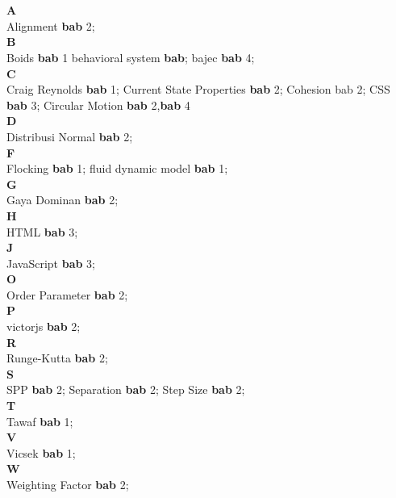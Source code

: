 \chapter*{\indexname}
\textbf{A}\\
Alignment \textbf{bab} 2;\\
\textbf{B}\\
Boids \textbf{bab} 1 behavioral system \textbf{bab}; bajec \textbf{bab} 4;\\
\textbf{C}\\
Craig Reynolds \textbf{bab} 1; Current State Properties \textbf{bab} 2; Cohesion bab 2; CSS \textbf{bab} 3; Circular Motion \textbf{bab} 2,\textbf{bab} 4\\
\textbf{D}\\
Distribusi Normal \textbf{bab} 2;\\
\textbf{F}\\
Flocking \textbf{bab} 1; fluid dynamic model \textbf{bab} 1;\\
\textbf{G}\\
Gaya Dominan \textbf{bab} 2;\\
\textbf{H}\\
HTML \textbf{bab} 3;\\
\textbf{J}\\
JavaScript \textbf{bab} 3;\\
\textbf{O}\\
Order Parameter \textbf{bab} 2;\\
\textbf{P}\\
victorjs \textbf{bab} 2;\\
\textbf{R}\\
Runge-Kutta \textbf{bab} 2;\\
\textbf{S}\\
SPP \textbf{bab} 2; Separation \textbf{bab} 2; Step Size \textbf{bab} 2;\\
\textbf{T}\\
Tawaf \textbf{bab} 1;\\
\textbf{V}\\
Vicsek \textbf{bab} 1;\\
\textbf{W}\\
Weighting Factor \textbf{bab} 2;\\

